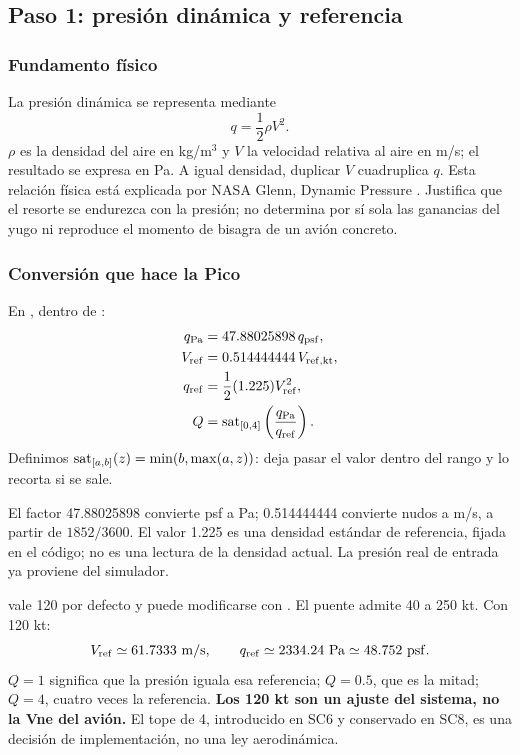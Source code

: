 \subsection{Paso 1: presión dinámica y referencia}
\subsubsection{Fundamento físico}
La presión dinámica se representa mediante
\begin{equation}
q=\frac12\rho V^2.
\end{equation}
$\rho$ es la densidad del aire en kg/m$^3$ y $V$ la velocidad relativa al aire en m/s; el resultado se expresa en Pa. A igual densidad, duplicar $V$ cuadruplica $q$. Esta relación física está explicada por NASA Glenn, Dynamic Pressure \cite{nasaq}. Justifica que el resorte se endurezca con la presión; no determina por sí sola las ganancias del yugo ni reproduce el momento de bisagra de un avión concreto.

\subsubsection{Conversión que hace la Pico}
En , dentro de :
\begin{align}
q_{\rm Pa}&=47.88025898\,q_{\rm psf},\\
V_{\rm ref}&=0.514444444\,V_{\rm ref,kt},\\
q_{\rm ref}&=\frac12(1.225)V_{\rm ref}^2,\\
Q&=\operatorname{sat}_{[0,4]}\left(\frac{q_{\rm Pa}}{q_{\rm ref}}\right).
\label{eq:q}
\end{align}
Definimos $\operatorname{sat}_{[a,b]}(z)=\min(b,\max(a,z))$: deja pasar el valor dentro del rango y lo recorta si se sale.

El factor 47.88025898 convierte psf a Pa; 0.514444444 convierte nudos a m/s, a partir de $1852/3600$. El valor 1.225 es una densidad estándar de referencia, fijada en el código; no es una lectura de la densidad actual. La presión real de entrada ya proviene del simulador.

 vale 120 por defecto y puede modificarse con . El puente admite 40 a 250 kt. Con 120 kt:
\begin{equation}
V_{\rm ref}\simeq61.7333\ {\rm m/s},\qquad
q_{\rm ref}\simeq2334.24\ {\rm Pa}\simeq48.752\ {\rm psf}.
\end{equation}
$Q=1$ significa que la presión iguala esa referencia; $Q=0.5$, que es la mitad; $Q=4$, cuatro veces la referencia. \textbf{Los 120 kt son un ajuste del sistema, no la Vne del avión.} El tope de 4, introducido en SC6 y conservado en SC8, es una decisión de implementación, no una ley aerodinámica.

